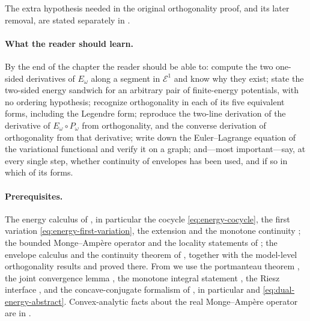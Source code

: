 The extra hypothesis needed in the original orthogonality proof, and its
later removal, are stated separately in
.

\paragraph{What the reader should learn.}
By the end of the chapter the reader should be able to: compute the two
one-sided derivatives of \(E_\omega\) along a segment in \(\mathcal E^1\) and
know why they exist; state the two-sided energy sandwich for an arbitrary
pair of finite-energy potentials, with no ordering hypothesis; recognize
orthogonality in each of its five equivalent forms, including the Legendre
form; reproduce the two-line derivation of the derivative of
\(E_\omega\circ P_\omega\) from orthogonality, and the converse derivation of
orthogonality from that derivative; write down the Euler--Lagrange equation
of the variational functional and verify it on a graph; and---most
important---say, at every single step, whether continuity of envelopes has
been used, and if so in which of its forms.

\paragraph{Prerequisites.}
The energy calculus of , in particular the cocycle
\eqref{eq:energy-cocycle}, the first variation
\eqref{eq:energy-first-variation}, the extension
 and the monotone continuity
; the bounded Monge--Amp\`ere operator
 and the locality statements of
; the envelope calculus
 and the continuity theorem
 of , together
with the model-level orthogonality results
 and
 proved there.  From
 we use the portmanteau theorem
, the joint convergence lemma
, the monotone integral statement
, the Riesz interface
, and the concave-conjugate formalism of
, in particular
 and \eqref{eq:dual-energy-abstract}.
Convex-analytic facts about the real Monge--Amp\`ere operator are in
.

